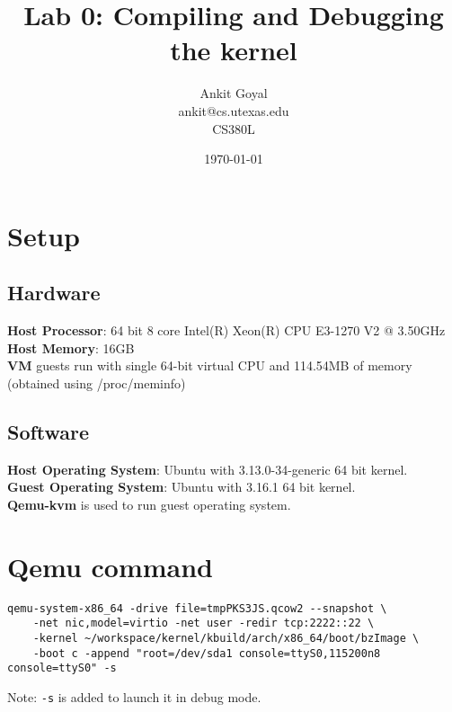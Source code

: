 \documentclass[10pt] {article}
\author{Ankit Goyal \\ankit@cs.utexas.edu \\ CS380L}
\title{Lab 0: Compiling and Debugging the kernel}
\date{\today}
\begin{document}
\maketitle

\section{Setup}
\subsection{Hardware}
\textbf{Host Processor}: 64 bit 8 core Intel(R) Xeon(R) CPU E3-1270 V2 @ 3.50GHz\\
\textbf{Host Memory}: 16GB \\
\textbf{VM} guests run with single 64-bit virtual CPU and 114.54MB of memory (obtained using /proc/meminfo)

\subsection{Software}
\textbf{Host Operating System}: Ubuntu with 3.13.0-34-generic 64 bit kernel.\\
\textbf{Guest Operating System}: Ubuntu with 3.16.1 64 bit kernel.\\
\textbf{Qemu-kvm} is used to run guest operating system. 


\section{Qemu command}
\begin{verbatim}
qemu-system-x86_64 -drive file=tmpPKS3JS.qcow2 --snapshot \
	-net nic,model=virtio -net user -redir tcp:2222::22 \
	-kernel ~/workspace/kernel/kbuild/arch/x86_64/boot/bzImage \
	-boot c -append "root=/dev/sda1 console=ttyS0,115200n8 console=ttyS0" -s  
\end{verbatim}

\noindent Note: \texttt{-s} is added to launch it in debug mode.

\end{document}
